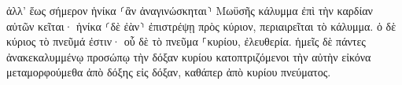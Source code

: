 \documentclass{openreader}
\begin{document}
ἀλλ’ ἕως σήμερον ἡνίκα ⸂ἂν ἀναγινώσκηται⸃ Μωϋσῆς κάλυμμα ἐπὶ τὴν καρδίαν αὐτῶν κεῖται· 
ἡνίκα ⸂δὲ ἐὰν⸃ ἐπιστρέψῃ πρὸς κύριον, περιαιρεῖται τὸ κάλυμμα. 
ὁ δὲ κύριος τὸ πνεῦμά ἐστιν· οὗ δὲ τὸ πνεῦμα ⸀κυρίου, ἐλευθερία. 
ἡμεῖς δὲ πάντες ἀνακεκαλυμμένῳ προσώπῳ τὴν δόξαν κυρίου κατοπτριζόμενοι τὴν αὐτὴν εἰκόνα μεταμορφούμεθα ἀπὸ δόξης εἰς δόξαν, καθάπερ ἀπὸ κυρίου πνεύματος. 
\end{document}
